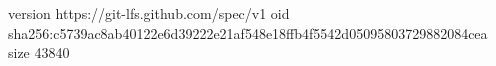 version https://git-lfs.github.com/spec/v1
oid sha256:c5739ac8ab40122e6d39222e21af548e18ffb4f5542d05095803729882084cea
size 43840

